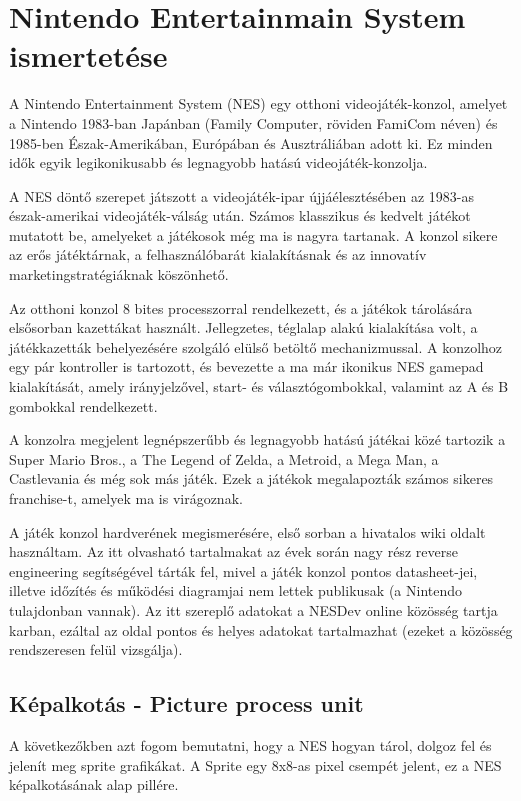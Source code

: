 \chapter{Nintendo Entertainmain System ismertetése}

A Nintendo Entertainment System (NES) egy otthoni videojáték-konzol, amelyet a Nintendo 1983-ban Japánban (Family Computer, röviden FamiCom néven) és 1985-ben Észak-Amerikában, Európában és Ausztráliában adott ki. Ez minden idők egyik legikonikusabb és legnagyobb hatású videojáték-konzolja.

A NES döntő szerepet játszott a videojáték-ipar újjáélesztésében az 1983-as észak-amerikai videojáték-válság után. Számos klasszikus és kedvelt játékot mutatott be, amelyeket a játékosok még ma is nagyra tartanak. A konzol sikere az erős játéktárnak, a felhasználóbarát kialakításnak és az innovatív marketingstratégiáknak köszönhető.

Az otthoni konzol 8 bites processzorral rendelkezett, és a játékok tárolására elsősorban kazettákat használt. Jellegzetes, téglalap alakú kialakítása volt, a játékkazetták behelyezésére szolgáló elülső betöltő mechanizmussal. A konzolhoz egy pár kontroller is tartozott, és bevezette a ma már ikonikus NES gamepad kialakítását, amely irányjelzővel, start- és választógombokkal, valamint az A és B gombokkal rendelkezett.


A konzolra megjelent legnépszerűbb és legnagyobb hatású játékai közé tartozik a Super Mario Bros., a The Legend of Zelda, a Metroid, a Mega Man, a Castlevania és még sok más játék. Ezek a játékok megalapozták számos sikeres franchise-t, amelyek ma is virágoznak.

A játék konzol hardverének megismerésére, első sorban a hivatalos wiki oldalt használtam. Az itt olvasható tartalmakat az évek során nagy rész reverse engineering segítségével tárták fel, mivel a játék konzol pontos datasheet-jei, illetve időzítés és működési diagramjai nem lettek publikusak (a Nintendo tulajdonban vannak). Az itt szereplő adatokat a NESDev online közösség tartja karban, ezáltal az oldal pontos és helyes adatokat tartalmazhat (ezeket a közösség rendszeresen felül vizsgálja).   

\section{Képalkotás - Picture process unit}

A következőkben azt fogom bemutatni, hogy a NES hogyan tárol, dolgoz fel és jelenít meg sprite grafikákat. A Sprite egy 8x8-as pixel csempét jelent, ez a NES képalkotásának alap pillére.

